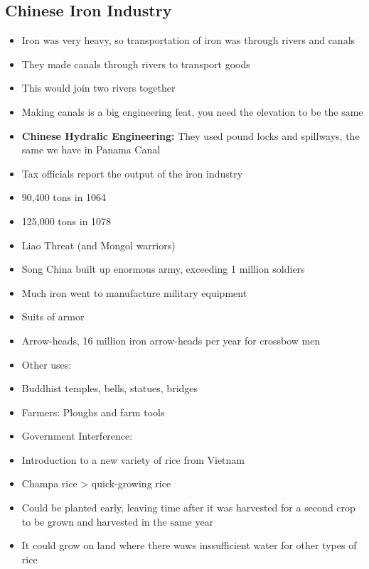 \documentclass{article}
\begin{document}
\subsection{Chinese Iron Industry}
\begin{itemize}
  \item Iron was very heavy, so transportation of iron
    was through rivers and canals
  \item They made canals through rivers to transport goods
  \item This would join two rivers together
  \item Making canals is a big engineering feat,
    you need the elevation to be the same
  \item \textbf{Chinese Hydralic Engineering:} They used pound locks and spillways,
    the same we have in Panama Canal
  \item Tax officials report the output of the iron industry

  \item 90,400 tons in 1064
  \item 125,000 tons in 1078
  \item Liao Threat (and Mongol warriors)
  \item Song China built up enormous army, exceeding 1 million soldiers
  \item Much iron went to manufacture military equipment
  \item Suits of armor
  \item Arrow-heads, 16 million iron arrow-heads per year for crossbow men
  \item Other uses:
  \item Buddhist temples, bells, statues, bridges
  \item Farmers: Ploughs and farm tools
  \item Government Interference:
  \item Introduction to a new variety of rice from Vietnam
  \item Champa rice > quick-growing rice
  \item Could be planted early, leaving time after it was harvested for a second crop
    to be grown and harvested in the same year
  \item It could grow on land where there waws inssufficient water for other types of rice
\end{itemize}
\end{document}
